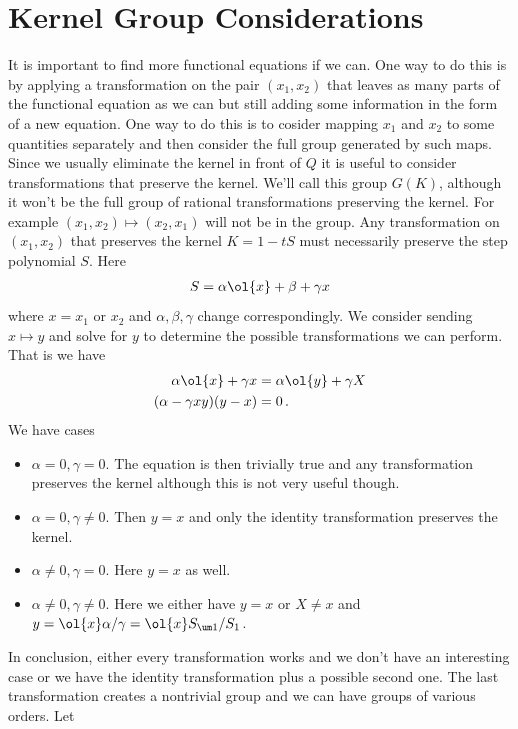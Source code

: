 \section{Kernel Group Considerations}
It is important to find more functional equations if we can. One way to do this is by applying a transformation on the pair $(x_1,x_2)$ that leaves as many parts of the functional equation as we can but still adding some information in the form of a new equation. One way to do this is to cosider mapping $x_1$ and $x_2$ to some quantities separately and then consider the full group generated by such maps. Since we usually eliminate the kernel in front of $Q$ it is useful to consider transformations that preserve the kernel.  We'll call this group $G(K)$, although it won't be the full group of rational transformations preserving the kernel. For example $(x_1,x_2) \mapsto (x_2,x_1)$ will not be in the group. Any transformation on $(x_1,x_2)$ that preserves the kernel $K = 1 -tS$ must necessarily preserve the step polynomial $S$. Here
\begin{align}
	S = \alpha \ol{x} + \beta + \gamma x
\end{align}
where $x = x_1$ or $x_2$ and $\alpha,\beta,\gamma$ change correspondingly. We consider sending $x \mapsto y$ and solve for $y$ to determine the possible transformations we can perform. That is we have
\begin{align}
	\alpha \ol{x} + \gamma x &=\alpha \ol{y} + \gamma X\\
	(\alpha - \gamma xy)(y-x) &= 0\,.
\end{align}
We have cases
\begin{itemize}
\item $\alpha = 0, \gamma = 0$. The equation is then trivially true and any transformation preserves the kernel although this is not very useful though.
\item $\alpha = 0, \gamma \neq 0$. Then $ y = x$ and only the identity transformation preserves the kernel.
\item $\alpha \neq 0, \gamma = 0$. Here $y = x$ as well.
\item $\alpha \neq 0, \gamma \neq 0$. Here we either have $y = x$ or $X\neq x$ and $y = \ol{x}\alpha/\gamma = \ol{x} S_{\um 1}/S_1$.
\end{itemize}
In conclusion, either every transformation works and we don't have an interesting case or we have the identity transformation plus a possible second one. The last transformation creates a nontrivial group and we can have groups of various orders. Let
